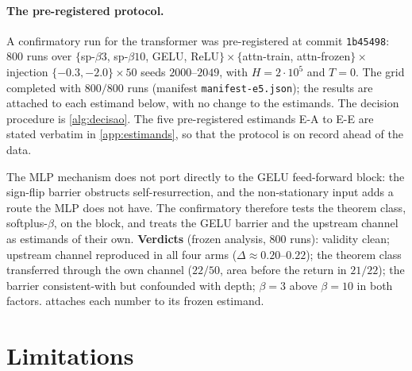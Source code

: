 \documentclass[11pt]{article}
\theoremstyle{definition}
\theoremstyle{remark}
\begin{document}
\paragraph{The pre-registered protocol.}
A confirmatory run for the transformer was pre-registered at commit
\texttt{1b45498}: 800 runs over
$\{$sp-$\beta3$, sp-$\beta10$, GELU, ReLU$\}\times\{$attn-train,
attn-frozen$\}\times$ injection $\{-0.3,-2.0\}\times50$ seeds $2000$--$2049$,
with $H=2\cdot10^{5}$ and $T=0$. The grid completed with $800/800$ runs (manifest \texttt{manifest-e5.json}); the results are attached to each estimand below, with no change to the estimands. The decision procedure is \cref{alg:decisao}. The five pre-registered estimands E-A to E-E are stated
verbatim in \cref{app:estimands}, so that the protocol is on record ahead of the
data.

The MLP mechanism does not port directly to the GELU feed-forward block: the
sign-flip barrier obstructs self-resurrection, and the non-stationary input
adds a route the MLP does not have. The confirmatory therefore tests the
theorem class, softplus-$\beta$, on the block, and treats the GELU barrier and
the upstream channel as estimands of their own. \textbf{Verdicts} (frozen
analysis, $800$ runs): validity clean; upstream channel reproduced in all four
arms ($\Delta\approx0.20$--$0.22$); the theorem class transferred through the
own channel ($22/50$, area before the return in $21/22$); the barrier
consistent-with but confounded with depth; $\beta=3$ above $\beta=10$ in both
factors.  attaches each number to its frozen estimand.

\section{Limitations}\label{sec:limits}
\end{document}
